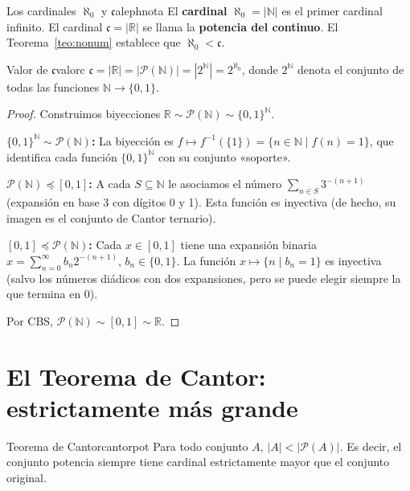 \begin{definicion}{Los cardinales $\aleph_0$ y $\mathfrak{c}$}{alephnota}
El \textbf{cardinal} $\aleph_0 = |\mathbb{N}|$ es el primer cardinal infinito. El cardinal $\mathfrak{c} = |\mathbb{R}|$ se llama la \textbf{potencia del continuo}. El Teorema~\ref{teo:nonum} establece que $\aleph_0 < \mathfrak{c}$.
\end{definicion}

\begin{proposicion}{Valor de $\mathfrak{c}$}{valorc}
$\mathfrak{c} = |\mathbb{R}| = |\mathcal{P}(\mathbb{N})| = |2^{\mathbb{N}}| = 2^{\aleph_0}$, donde $2^{\mathbb{N}}$ denota el conjunto de todas las funciones $\mathbb{N} \to \{0,1\}$.
\end{proposicion}

\begin{proof}
Construimos biyecciones $\mathbb{R} \sim \mathcal{P}(\mathbb{N}) \sim \{0,1\}^{\mathbb{N}}$.

\textbf{$\{0,1\}^{\mathbb{N}} \sim \mathcal{P}(\mathbb{N})$:} La biyección es $f \mapsto f^{-1}(\{1\}) = \{n \in \mathbb{N} \mid f(n) = 1\}$, que identifica cada función $\{0,1\}^{\mathbb{N}}$ con su conjunto «soporte».

\textbf{$\mathcal{P}(\mathbb{N}) \preceq [0,1]$:} A cada $S \subseteq \mathbb{N}$ le asociamos el número $\sum_{n \in S} 3^{-(n+1)}$ (expansión en base 3 con dígitos 0 y 1). Esta función es inyectiva (de hecho, su imagen es el conjunto de Cantor ternario).

\textbf{$[0,1] \preceq \mathcal{P}(\mathbb{N})$:} Cada $x \in [0,1]$ tiene una expansión binaria $x = \sum_{n=0}^\infty b_n 2^{-(n+1)}$, $b_n \in \{0,1\}$. La función $x \mapsto \{n \mid b_n = 1\}$ es inyectiva (salvo los números diádicos con dos expansiones, pero se puede elegir siempre la que termina en 0).

Por CBS, $\mathcal{P}(\mathbb{N}) \sim [0,1] \sim \mathbb{R}$.
\end{proof}

\section{El Teorema de Cantor: estrictamente más grande}\label{sec:cantorpot}

\begin{teorema}{Teorema de Cantor}{cantorpot}
Para todo conjunto $A$, $|A| < |\mathcal{P}(A)|$. Es decir, el conjunto potencia siempre tiene cardinal estrictamente mayor que el conjunto original.
\end{teorema}


